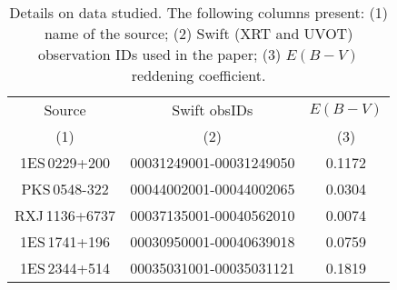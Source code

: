 \noindent





\begin{table} 
\centering 
\begin{tabular}{c|c|c}
\hline
\hline
 Source &  Swift obsIDs  & $E(B-V)$   \\
(1) &  (2)& (3)     \\
\hline
1ES\,0229+200 & 00031249001-00031249050   &  0.1172  \\
PKS\,0548-322 & 00044002001-00044002065  &  0.0304   \\
RXJ\,1136+6737 & 00037135001-00040562010  &  0.0074   \\
1ES\,1741+196  & 00030950001-00040639018   &  0.0759   \\
1ES\,2344+514 & 00035031001-00035031121  &  0.1819   \\
\hline
\end{tabular}
\caption[]{Details on data studied. The following columns present: (1) name of the source; (2) Swift (XRT and UVOT) observation IDs used in the paper; (3) $E(B-V)$ reddening coefficient.}
  \label{table:datasummary}
\end{table}







 



